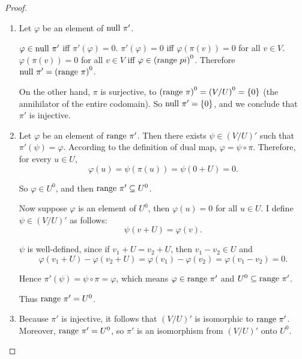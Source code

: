 \begin{proof}
    \begin{enumerate}[label={(\alph*)}]
        \item Let $\varphi$ be an element of $\operatorname{null}\,{\pi'}$.

              $\varphi\in\operatorname{null}\,{\pi'}$ iff $\pi'(\varphi) = 0$. $\pi'(\varphi) = 0$ iff $\varphi(\pi(v)) = 0$ for all $v\in V$. $\varphi(\pi(v)) = 0$ for all $v\in V$ iff $\varphi\in {(\operatorname{range}\,{pi})}^{0}$. Therefore $\operatorname{null}\,{\pi'} = {(\operatorname{range}\,{\pi})}^{0}$.

              On the other hand, $\pi$ is surjective, to ${(\operatorname{range}\,{\pi})}^{0} = {(V/U)}^{0} = \{0\}$ (the annihilator of the entire codomain). So $\operatorname{null}\,{\pi'} = \{0\}$, and we conclude that $\pi'$ is injective.
        \item Let $\varphi$ be an element of $\operatorname{range}\,{\pi'}$. Then there exists $\psi\in {(V/U)}'$ such that $\pi'(\psi) = \varphi$. According to the definition of dual map, $\varphi = \psi\circ \pi$. Therefore, for every $u\in U$,
              \[
                  \varphi(u) = \psi(\pi(u)) = \psi(0 + U) = 0.
              \]

              So $\varphi\in U^{0}$, and then $\operatorname{range}\,{\pi'}\subseteq U^{0}$.

              Now suppose $\varphi$ is an element of $U^{0}$, then $\varphi(u) = 0$ for all $u\in U$. I define $\psi\in {(V/U)}'$ as follows:
              \[
                  \psi(v + U) = \varphi(v).
              \]

              $\psi$ is well-defined, since if $v_{1} + U = v_{2} + U$, then $v_{1} - v_{2}\in U$ and
              \[
                  \varphi(v_{1} + U) - \varphi(v_{2} + U) = \varphi(v_{1}) - \varphi(v_{2}) = \varphi(v_{1} - v_{2}) = 0.
              \]

              Hence $\pi'(\psi) = \psi\circ\pi = \varphi$, which means $\varphi\in \operatorname{range}\,{\pi'}$ and $U^{0}\subseteq \operatorname{range}\,{\pi'}$.

              Thus $\operatorname{range}\,{\pi'} = U^{0}$.
        \item Because $\pi'$ is injective, it follows that ${(V/U)}'$ is isomorphic to $\operatorname{range}\,{\pi'}$. Moreover, $\operatorname{range}\,{\pi'} = U^{0}$, so $\pi'$ is an isomorphism from ${(V/U)}'$ onto $U^{0}$.\qedhere
    \end{enumerate}
\end{proof}
\newpage

